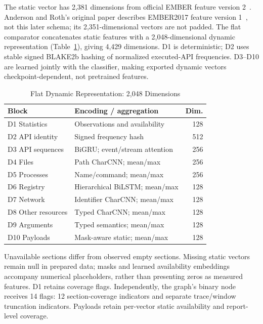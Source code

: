 \documentclass[journal]{IEEEtran}
\begin{document}
The static vector has 2,381 dimensions from official EMBER feature version
2~\cite{emberrepo}. Anderson and Roth's original paper describes EMBER2017
feature version 1~\cite{ember}, not this later schema; its 2,351-dimensional
vectors are not padded. The flat comparator concatenates static features
with a 2,048-dimensional dynamic representation (Table~\ref{tab:blocks}),
giving 4,429 dimensions. D1 is deterministic; D2 uses stable signed BLAKE2b
hashing of normalized executed-API frequencies. D3--D10 are learned jointly
with the classifier, making exported dynamic vectors checkpoint-dependent,
not pretrained features.

\begin{table}[t]
\caption{Flat Dynamic Representation: 2,048 Dimensions}
\label{tab:blocks}
\centering
\small
\setlength{\tabcolsep}{4pt}
\begin{tabular}{@{}llr@{}}
\toprule
Block & Encoding / aggregation & Dim.\\
\midrule
D1 Statistics & Observations and availability & 128\\
D2 API identity & Signed frequency hash & 512\\
D3 API sequences & BiGRU; event/stream attention & 256\\
D4 Files & Path CharCNN; mean/max & 256\\
D5 Processes & Name/command; mean/max & 256\\
D6 Registry & Hierarchical BiLSTM; mean/max & 128\\
D7 Network & Identifier CharCNN; mean/max & 128\\
D8 Other resources & Typed CharCNN; mean/max & 128\\
D9 Arguments & Typed semantics; mean/max & 128\\
D10 Payloads & Mask-aware static; mean/max & 128\\
\bottomrule
\end{tabular}
\end{table}

Unavailable sections differ from observed empty sections. Missing static
vectors remain null in prepared data; masks and learned availability
embeddings accompany numerical placeholders, rather than presenting zeros
as measured features. D1 retains coverage flags. Independently, the graph's
binary node receives 14 flags: 12 section-coverage indicators and separate
trace/window truncation indicators. Payloads retain per-vector static
availability and report-level coverage.
\end{document}
